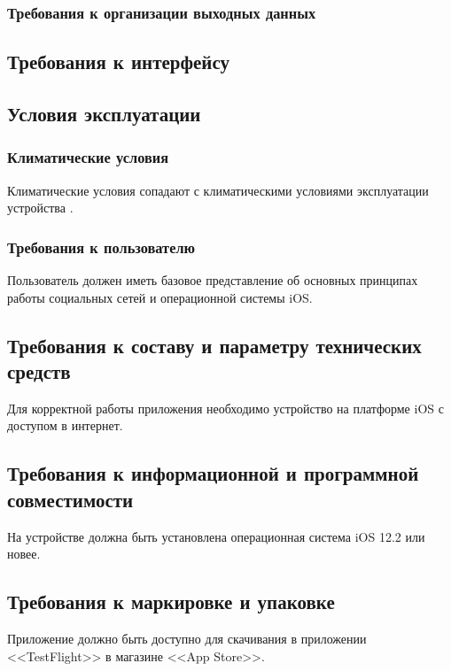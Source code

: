 \documentclass[a4paper,12pt,reqno]{article}
\begin{document}
	\subsubsection{Требования к организации выходных данных}
	
	\clearpage
	\subsection{Требования к интерфейсу}
	
	\subsection{Условия эксплуатации}
	\subsubsection{Климатические условия}
	Климатические условия сопадают с климатическими условиями эксплуатации\\ устройства \cite{terms}.
	\subsubsection{Требования к пользователю}
	Пользователь должен иметь базовое представление об основных принципах работы социальных сетей и операционной системы iOS. 
	\subsection{Требования к составу и параметру технических средств}
	Для корректной работы приложения необходимо устройство на платформе iOS с доступом в интернет.
	\subsection{Требования к информационной и программной совместимости}
	На устройстве должна быть установлена операционная система iOS 12.2 или новее.
	\subsection{Требования к маркировке и упаковке}
	Приложение должно быть доступно для скачивания в приложении <<TestFlight>> в магазине <<App Store>>.
	
\end{document}
